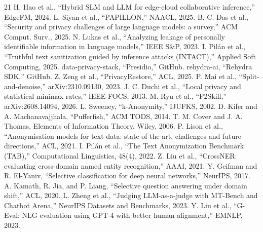 \documentclass[conference]{IEEEtran}
\begin{document}
\begin{thebibliography}{21}
 H. Hao et al., ``Hybrid SLM and LLM for edge-cloud collaborative inference,'' EdgeFM, 2024.
 L. Siyan et al., ``PAPILLON,'' NAACL, 2025.
 B. C. Das et al., ``Security and privacy challenges of large language models: a survey,'' ACM Comput. Surv., 2025.
 N. Lukas et al., ``Analyzing leakage of personally identifiable information in language models,'' IEEE S\&P, 2023.
 I. Pil\'an et al., ``Truthful text sanitization guided by inference attacks (INTACT),'' Applied Soft Computing, 2025.
 data-privacy-stack, ``Presidio,'' GitHub.
 rehydra-ai, ``Rehydra SDK,'' GitHub.
 Z. Zeng et al., ``PrivacyRestore,'' ACL, 2025.
 P. Mai et al., ``Split-and-denoise,'' arXiv:2310.09130, 2023.
 J. C. Duchi et al., ``Local privacy and statistical minimax rates,'' IEEE FOCS, 2013.
 M. Ryu et al., ``P2Skill,'' arXiv:2608.14094, 2026.
 L. Sweeney, ``k-Anonymity,'' IJUFKS, 2002.
 D. Kifer and A. Machanavajjhala, ``Pufferfish,'' ACM TODS, 2014.
 T. M. Cover and J. A. Thomas, Elements of Information Theory, Wiley, 2006.
 P. Lison et al., ``Anonymisation models for text data: state of the art, challenges and future directions,'' ACL, 2021.
 I. Pil\'an et al., ``The Text Anonymization Benchmark (TAB),'' Computational Linguistics, 48(4), 2022.
 Z. Liu et al., ``CrossNER: evaluating cross-domain named entity recognition,'' AAAI, 2021.
 Y. Geifman and R. El-Yaniv, ``Selective classification for deep neural networks,'' NeurIPS, 2017.
 A. Kamath, R. Jia, and P. Liang, ``Selective question answering under domain shift,'' ACL, 2020.
 L. Zheng et al., ``Judging LLM-as-a-judge with MT-Bench and Chatbot Arena,'' NeurIPS Datasets and Benchmarks, 2023.
 Y. Liu et al., ``G-Eval: NLG evaluation using GPT-4 with better human alignment,'' EMNLP, 2023.
\end{thebibliography}
\end{document}

